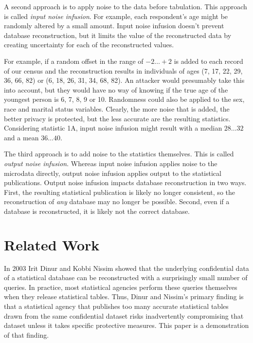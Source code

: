 \documentclass[runningheads]{llncs}
\begin{document}
A second approach is to apply noise to the data before
tabulation. This approach is called \emph{input noise infusion}. For example, each respondent's age might be randomly
altered by a small amount. Input noise infusion
doesn't prevent database reconstruction, but it limits the value of
the reconstructed data by creating uncertainty for each of the
reconstructed values. 

For example, if a random offset in the range of $-2 \ldots +2$ is
added to each record of our census and the reconstruction results in individuals of
ages (7, 17, 22, 29, 36, 66, 82) or (6, 18, 26, 31, 34, 68,
82). An attacker would presumably take this into account, but they
would have no way of knowing if the true age of the youngest person is
6, 7, 8, 9 or 10. Randomness could also be applied to the sex, race
and marital status variables. Clearly, the more noise that is added,
the better privacy is protected, but the less accurate are the
resulting statistics. Considering statistic 1A, input noise infusion
might result with a median $28\ldots32$ and a mean $36\ldots40$. 

The third approach is to add noise to the statistics themselves. This
is called \emph{output noise infusion}. Whereas input noise infusion
applies noise to the microdata directly, output noise infusion applies
output to the statistical publications.  Output noise infusion impacts
database reconstruction in two ways. First, the resulting statistical
publication is likely no longer consistent, so the reconstruction of
\emph{any} database may no longer be possible. Second, even if a
database is reconstructed, it is likely not the correct database.

\section{Related Work}

In 2003 Irit Dinur and Kobbi Nissim\cite{DinurNissim2003} showed that the underlying
confidential data of a statistical database can be reconstructed with
a surprisingly small number of queries. In practice, most statistical
agencies perform these queries themselves when they release
statistical tables. Thus, Dinur and Nissim's primary finding
is that a statistical agency that publishes too many accurate statistical
tables drawn from the same confidential dataset risks inadvertently
compromising that dataset unless it takes specific protective
measures. This paper is a demonstration of that finding.
\end{document}
